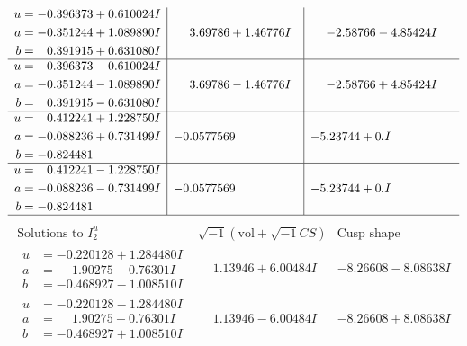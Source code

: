 \documentclass[1p]{elsarticle_modified}
\theoremstyle{definition}
\newcommand{\I}{\sqrt{-1}}
\begin{document}
$$\begin{array}{c|c|c}
\begin{aligned}
u &= -0.396373 + 0.610024 I \\
a &= -0.351244 + 1.089890 I \\
b &= \phantom{-}0.391915 + 0.631080 I\end{aligned}
 & \phantom{-}3.69786 + 1.46776 I & -2.58766 - 4.85424 I \\ \hline\begin{aligned}
u &= -0.396373 - 0.610024 I \\
a &= -0.351244 - 1.089890 I \\
b &= \phantom{-}0.391915 - 0.631080 I\end{aligned}
 & \phantom{-}3.69786 - 1.46776 I & -2.58766 + 4.85424 I \\ \hline\begin{aligned}
u &= \phantom{-}0.412241 + 1.228750 I \\
a &= -0.088236 + 0.731499 I \\
b &= -0.824481\phantom{ +0.000000I}\end{aligned}
 & -0.0577569\phantom{ +0.000000I} & -5.23744 + 0. I\phantom{ +0.000000I} \\ \hline\begin{aligned}
u &= \phantom{-}0.412241 - 1.228750 I \\
a &= -0.088236 - 0.731499 I \\
b &= -0.824481\phantom{ +0.000000I}\end{aligned}
 & -0.0577569\phantom{ +0.000000I} & -5.23744 + 0. I\phantom{ +0.000000I}\\
 \hline 
 \end{array}$$\newpage$$\begin{array}{c|c|c}  
\text{Solutions to }I^u_{2}& \I (\text{vol} + \sqrt{-1}CS) & \text{Cusp shape}\\
 \hline 
\begin{aligned}
u &= -0.220128 + 1.284480 I \\
a &= \phantom{-}1.90275 - 0.76301 I \\
b &= -0.468927 - 1.008510 I\end{aligned}
 & \phantom{-}1.13946 + 6.00484 I & -8.26608 - 8.08638 I \\ \hline\begin{aligned}
u &= -0.220128 - 1.284480 I \\
a &= \phantom{-}1.90275 + 0.76301 I \\
b &= -0.468927 + 1.008510 I\end{aligned}
 & \phantom{-}1.13946 - 6.00484 I & -8.26608 + 8.08638 I \\ \hline\begin{aligned}

\end{aligned}
\end{array}$$
\end{document}
